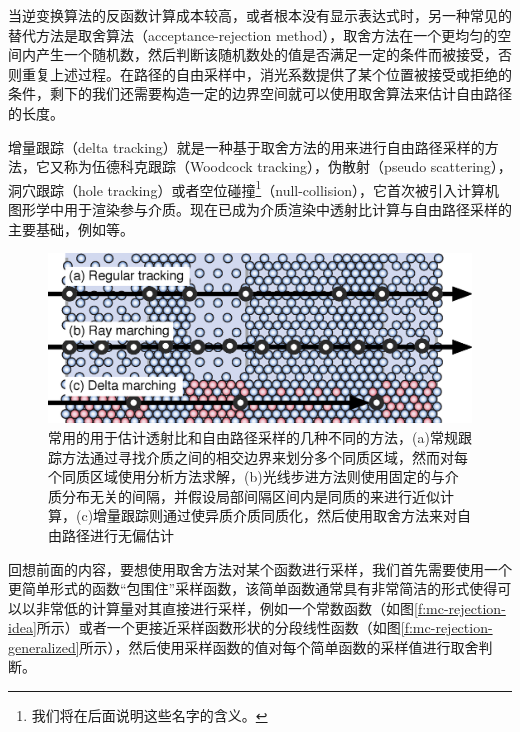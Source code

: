 当逆变换算法的反函数计算成本较高，或者根本没有显示表达式时，另一种常见的替代方法是取舍算法（acceptance-rejection method），取舍方法在一个更均匀的空间内产生一个随机数，然后判断该随机数处的值是否满足一定的条件而被接受，否则重复上述过程。在路径的自由采样中，消光系数提供了某个位置被接受或拒绝的条件，剩下的我们还需要构造一定的边界空间就可以使用取舍算法来估计自由路径的长度。

增量跟踪（delta tracking）就是一种基于取舍方法的用来进行自由路径采样的方法，它又称为伍德科克跟踪（Woodcock tracking）\cite{a:TechniquesusedintheGEMcodeforMonteCarloneu-tronicscalculationsinreactorsandothersystemsofcomplexgeometry}，伪散射（pseudo scattering），洞穴跟踪（hole tracking）或者空位碰撞\footnote{我们将在后面说明这些名字的含义。}（null-collision），它首次被\cite{a:UnbiasedGlobalIlluminationwithParticipatingMedia}引入计算机图形学中用于渲染参与介质。现在已成为介质渲染中透射比计算与自由路径采样的主要基础，例如\cite{a:FreePathSamplinginHighResolutionInhomogeneousParticipatingMedia,a:EfficientFreePathSamplinginInhomogeneousMedia,a:ResidualRatioTrackingforEstimatingAttenuationinParticipatingMedia,a:ProgressivePhotonBeams}等。

\begin{figure}
	\includegraphics[width=1.0\textwidth]{figures/pm/tracking}
	\caption{常用的用于估计透射比和自由路径采样的几种不同的方法，(a)常规跟踪方法通过寻找介质之间的相交边界来划分多个同质区域，然而对每个同质区域使用分析方法求解，(b)光线步进方法则使用固定的与介质分布无关的间隔，并假设局部间隔区间内是同质的来进行近似计算，(c)增量跟踪则通过使异质介质同质化，然后使用取舍方法来对自由路径进行无偏估计}
	\label{f:pm-tracking}
\end{figure}

回想前面的内容，要想使用取舍方法对某个函数进行采样，我们首先需要使用一个更简单形式的函数“包围住”采样函数，该简单函数通常具有非常简洁的形式使得可以以非常低的计算量对其直接进行采样，例如一个常数函数（如图\ref{f:mc-rejection-idea}所示）或者一个更接近采样函数形状的分段线性函数（如图\ref{f:mc-rejection-generalized}所示），然后使用采样函数的值对每个简单函数的采样值进行取舍判断。

